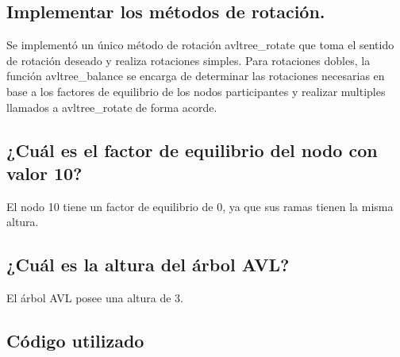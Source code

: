 \documentclass[a4paper,notitlepage]{article}
\begin{document}
\subsection{Implementar los métodos de rotación.}
Se implementó un único método de rotación avltree{\_}rotate que toma el sentido
de rotación deseado y realiza rotaciones simples. Para rotaciones dobles, la
función avltree{\_}balance se encarga de determinar las rotaciones necesarias
en base a los factores de equilibrio de los nodos participantes y realizar
multiples llamados a avltree{\_}rotate de forma acorde.

\subsection{¿Cuál es el factor de equilibrio del nodo con valor 10?}
El nodo 10 tiene un factor de equilibrio de 0, ya que sus ramas tienen la misma
altura.

\subsection{¿Cuál es la altura del árbol AVL?}
El árbol AVL posee una altura de 3.

\begin{appendix}
    \section{Código utilizado}
    
\end{appendix}
\end{document}
